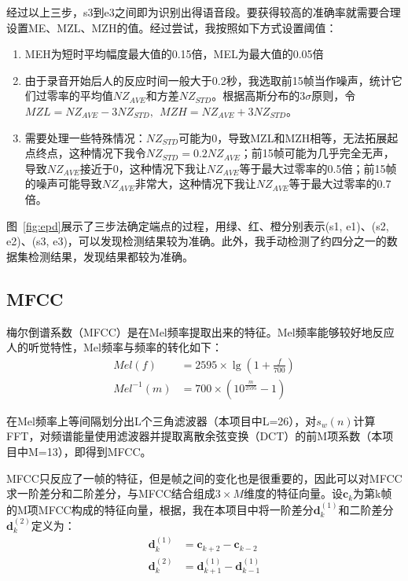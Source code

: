 \documentclass[UTF8]{article}
\begin{document}
经过以上三步，s3到e3之间即为识别出得语音段。要获得较高的准确率就需要合理设置ME、MZL、MZH的值。经过尝试，我按照如下方式设置阈值：
\begin{enumerate}
	\item MEH为短时平均幅度最大值的0.15倍，MEL为最大值的0.05倍
	\item 由于录音开始后人的反应时间一般大于0.2秒，我选取前15帧当作噪声，统计它们过零率的平均值$NZ_{AVE}$和方差$NZ_{STD}$。根据高斯分布的$3\sigma$原则，令$MZL=NZ_{AVE}-3NZ_{STD},~~MZH=NZ_{AVE}+3NZ_{STD}$。
	\item 需要处理一些特殊情况：$NZ_{STD}$可能为0，导致MZL和MZH相等，无法拓展起点终点，这种情况下我令$NZ_{STD}=0.2NZ_{AVE}$；前15帧可能为几乎完全无声，导致$NZ_{AVE}$接近于0，这种情况下我让$NZ_{AVE}$等于最大过零率的0.5倍；前15帧的噪声可能导致$NZ_{AVE}$非常大，这种情况下我让$NZ_{AVE}$等于最大过零率的0.7倍。
\end{enumerate}

图~\ref{fig:epd}展示了三步法确定端点的过程，用绿、红、橙分别表示(s1, e1)、(s2, e2)、(s3, e3)，可以发现检测结果较为准确。此外，我手动检测了约四分之一的数据集检测结果，发现结果都较为准确。

\subsection{MFCC}
梅尔倒谱系数（MFCC）是在Mel频率提取出来的特征。Mel频率能够较好地反应人的听觉特性，Mel频率与频率的转化如下：
\begin{align*}
	Mel(f)      & =2595 \times \lg (1+\frac{f}{700})  \\
	Mel^{-1}(m) & =700 \times (10^{\frac{m}{2595}}-1) 
\end{align*}

在Mel频率上等间隔划分出L个三角滤波器（本项目中L=26），对$s_w(n)$计算FFT，对频谱能量使用滤波器并提取离散余弦变换（DCT）的前M项系数（本项目中M=13），即得到MFCC。

MFCC只反应了一帧的特征，但是帧之间的变化也是很重要的，因此可以对MFCC求一阶差分和二阶差分，与MFCC结合组成$3 \times M$维度的特征向量。设$\bm{c}_k$为第k帧的M项MFCC构成的特征向量，根据\cite{huang2001spoken}，我在本项目中将一阶差分$\bm{d}^{(1)}_k$和二阶差分$\bm{d}^{(2)}_k$定义为：
\begin{align*}
	\bm{d}^{(1)}_k & =\bm{c}_{k+2}-\bm{c}_{k-2}             \\
	\bm{d}^{(2)}_k & =\bm{d}^{(1)}_{k+1}-\bm{d}^{(1)}_{k-1} \\
\end{align*}
\end{document}
